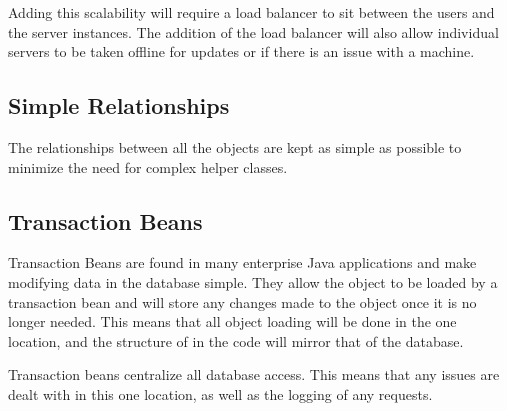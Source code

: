 \par
Adding this scalability will require a load balancer to sit between the users and the server instances. The addition of the load balancer will also allow individual servers to be taken offline for updates or if there is an issue with a machine.

\subsection{Simple Relationships}
\par
The relationships between all the objects are kept as simple as possible to minimize the need for complex helper classes.

\subsection{Transaction Beans}
\par
Transaction Beans are found in many enterprise Java applications and make modifying data in the database simple. They allow the object to be loaded by a transaction bean and will store any changes made to the object once it is no longer needed. This means that all object loading will be done in the one location, and the structure of in the code will mirror that of the database.

Transaction beans centralize all database access. This means that any issues are dealt with in this one location, as well as the logging of any requests.

